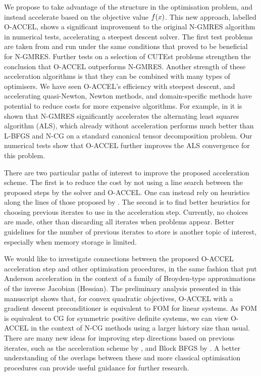 \documentclass[main.tex]{subfiles}
\begin{document}
We propose to take advantage of the structure in the optimisation
problem, and instead accelerate based on the objective value
$f(x)$.  This new approach, labelled O-ACCEL, shows a significant
improvement to the original N-GMRES algorithm in numerical tests,
accelerating a steepest descent solver. The first test problems are
taken from \citet{sterck2013steepest} and run under the same
conditions that proved to be beneficial for N-GMRES.  Further tests on
a selection of CUTEst problems strengthen the conclusion that O-ACCEL
outperforms N-GMRES.  Another strength of these acceleration
algorithms is that they can be combined with many types of
optimisers. We have seen O-ACCEL's efficiency with steepest descent,
and accelerating quasi-Newton, Newton methods, and domain-specific
methods have potential to reduce costs for more expensive algorithms.
For example, in \citet{sterck2013steepest} it is shown that N-GMRES
significantly accelerates the alternating least squares algorithm
(ALS), which already without acceleration performs much better than
L-BFGS and N-CG on a standard canonical tensor decomposition
problem. Our numerical tests show that O-ACCEL further improves the
ALS convergence for this problem.

There are two particular paths of interest to improve the proposed
acceleration scheme. The first is to reduce the cost by not using a
line search between the proposed steps by the solver and O-ACCEL. One
can instead rely on heuristics along the lines of those proposed by
\citet{washio1997krylov}.  The second is to find better heuristics for
choosing previous iterates to use in the acceleration step. Currently,
no choices are made, other than discarding all iterates when problems
appear.  Better guidelines for the number of previous iterates to
store is another topic of interest, especially when memory storage is
limited.

We would like to investigate connections between the proposed O-ACCEL
acceleration step and other optimisation procedures, in the same
fashion that \citet{fang2009two} put Anderson acceleration in the
context of a family of Broyden-type approximations of the inverse
Jacobian (Hessian).  The preliminary analysis presented in this
manuscript shows that, for convex quadratic objectives, O-ACCEL with a
gradient descent preconditioner is equivalent to FOM for linear
systems. As FOM is equivalent to CG for symmetric positive definite
systems, we can view O-ACCEL in the context of N-CG methods using a
larger history size than usual.  There are many new ideas for
improving step directions based on previous iterates, such as the
acceleration scheme by \citet{damien2016regularized}, and Block BFGS
by \citet{gao2016block}.  A better understanding of the overlaps
between these and more classical optimisation procedures can provide
useful guidance for further research.
\end{document}
